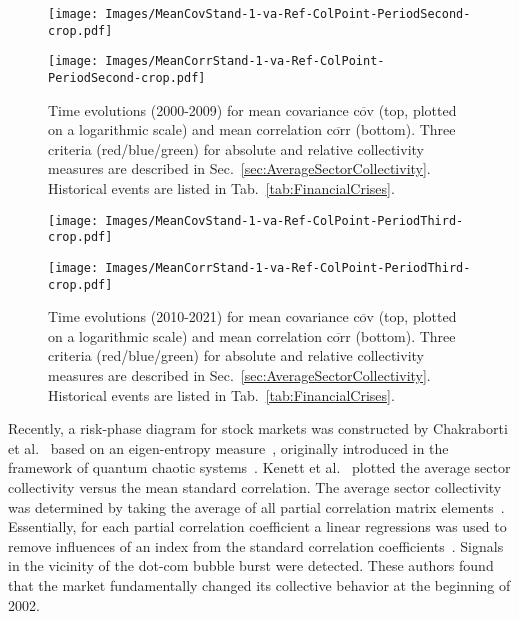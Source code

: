 \documentclass[aps, pra, groupedaddress, showkeys, twocolumn, floatfix, 10pt]{revtex4-2}
\newcommand*\mean[1]{\overline{#1}}
\begin{document}
%
\begin{figure*}[!htb]
	\centering
	\begin{minipage}{1.0\textwidth}
		\subfloat%
		{\texttt{[image: Images/MeanCovStand-1-va-Ref-ColPoint-PeriodSecond-crop.pdf]}
		}\par
		\subfloat%
		{\texttt{[image: Images/MeanCorrStand-1-va-Ref-ColPoint-PeriodSecond-crop.pdf]}
		}
	\end{minipage}%
	\caption{\label{subfig:Main:MeanStandMeanCritP2}Time evolutions (2000-2009) for mean covariance $\mean{\text{cov}}$ (top, plotted on a logarithmic scale) and mean correlation $\mean{\text{corr}}$ (bottom). Three criteria (red/blue/green) for absolute and relative collectivity measures are described in Sec.~\ref{sec:AverageSectorCollectivity}. Historical events are listed in Tab.~\ref{tab:FinancialCrises}.}
\end{figure*}



%
\begin{figure*}[!htb]
	\centering
	\begin{minipage}{1.0\textwidth}
		\subfloat%
		{\texttt{[image: Images/MeanCovStand-1-va-Ref-ColPoint-PeriodThird-crop.pdf]}
		}\par
		\subfloat%
		{\texttt{[image: Images/MeanCorrStand-1-va-Ref-ColPoint-PeriodThird-crop.pdf]}
		}
	\end{minipage}%
	\caption{\label{subfig:Main:MeanStandMeanCritP3}Time evolutions (2010-2021) for mean covariance $\mean{\text{cov}}$ (top, plotted on a logarithmic scale) and mean correlation $\mean{\text{corr}}$ (bottom). Three criteria (red/blue/green) for absolute and relative collectivity measures are described in Sec.~\ref{sec:AverageSectorCollectivity}. Historical events are listed in Tab.~\ref{tab:FinancialCrises}.}
\end{figure*}



Recently, a risk-phase diagram for stock markets was constructed by Chakraborti et al.~\cite{Chakraborti_2020} based on an eigen-entropy measure~\cite{DROZDZ2000440,IZRAILEV1990299},
originally introduced in the framework of quantum chaotic systems~\cite{IZRAILEV198813}.
Kenett et al.~\cite{kenett2011index} plotted the average sector collectivity versus the 
mean standard correlation.
The average sector collectivity was determined by taking the average of all partial correlation matrix elements~\cite{shapira2009index,kenett2010dominating,Kenett_2015}. Essentially, for each partial correlation coefficient a linear regressions was used to remove influences of an index from the standard correlation coefficients~\cite{anderson2003introduction,wiki:2021:PartialCorr}.
Signals in the vicinity of the dot-com bubble burst were detected.
These authors found that the market fundamentally changed its collective behavior at the beginning of 2002.
\end{document}
